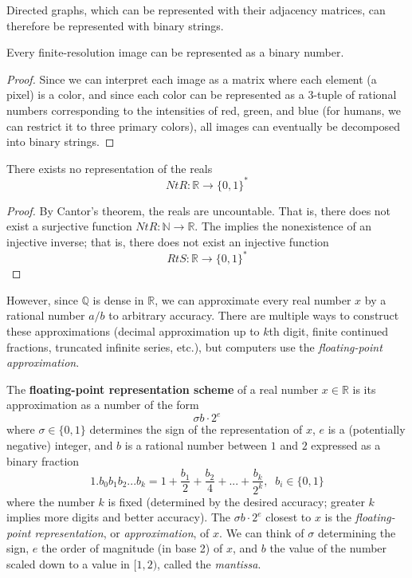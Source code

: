 \documentclass{article}
\begin{document}
  \begin{corollary}
  Directed graphs, which can be represented with their adjacency matrices, can therefore be represented with binary strings. 
  \end{corollary}

  \begin{theorem}
  Every finite-resolution image can be represented as a binary number. 
  \end{theorem}
  \begin{proof}
  Since we can interpret each image as a matrix where each element (a pixel) is a color, and since each color can be represented as a 3-tuple of rational numbers corresponding to the intensities of red, green, and blue (for humans, we can restrict it to three primary colors), all images can eventually be decomposed into binary strings. 
  \end{proof}

  \begin{theorem}
  There exists no representation of the reals
  \[NtR: \mathbb{R} \longrightarrow \{0, 1\}^\ast\]
  \end{theorem}
  \begin{proof}
  By Cantor's theorem, the reals are uncountable. That is, there does not exist a surjective function $NtR: \mathbb{N} \longrightarrow \mathbb{R}$. The implies the nonexistence of an injective inverse; that is, there does not exist an injective function 
  \[RtS: \mathbb{R} \longrightarrow \{0,1\}^\ast\]
  \end{proof}

  However, since $\mathbb{Q}$ is dense in $\mathbb{R}$, we can approximate every real number $x$ by a rational number $a/b$ to arbitrary accuracy. There are multiple ways to construct these approximations (decimal approximation up to $k$th digit, finite continued fractions, truncated infinite series, etc.), but computers use the \textit{floating-point approximation}. 

  \begin{definition}
  The \textbf{floating-point representation scheme} of a real number $x \in \mathbb{R}$ is its approximation as a number of the form 
  \[\sigma b \cdot 2^e\]
  where $\sigma \in \{0, 1\}$ determines the sign of the representation of $x$, $e$ is a (potentially negative) integer, and $b$ is a rational number between $1$ and $2$ expressed as a binary fraction 
  \[1.b_0 b_1 b_2 ... b_k = 1 + \frac{b_1}{2} + \frac{b_2}{4} + ... + \frac{b_k}{2^k}, \;\; b_i \in \{0,1\}\]
  where the number $k$ is fixed (determined by the desired accuracy; greater $k$ implies more digits and better accuracy). The $\sigma b \cdot 2^e$ closest to $x$ is the \textit{floating-point representation}, or \textit{approximation}, of $x$. We can think of $\sigma$ determining the sign, $e$ the order of magnitude (in base 2) of $x$, and $b$ the value of the number scaled down to a value in $[1,2)$, called the \textit{mantissa}. 
  \end{definition}
\end{document}
